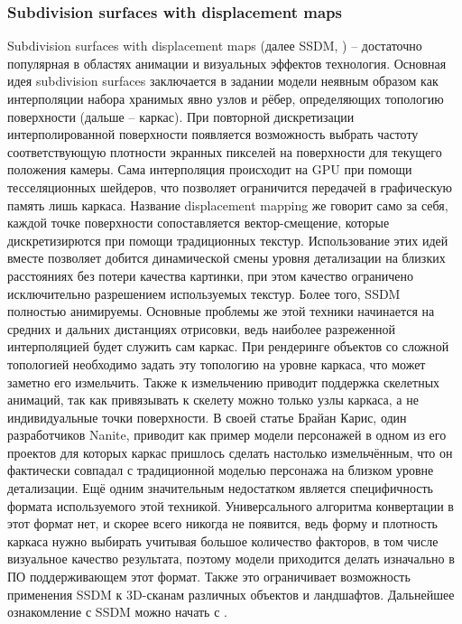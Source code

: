 \documentclass[12pt]{extarticle}
\begin{document}
\subsubsection{Subdivision surfaces with displacement maps}
Subdivision surfaces with displacement maps (далее SSDM, \cite{ssdm}) -- достаточно популярная в областях анимации и визуальных эффектов технология. Основная идея subdivision surfaces заключается в задании модели неявным образом как интерполяции набора хранимых явно узлов и рёбер, определяющих топологию поверхности (дальше -- каркас). При повторной дискретизации интерполированной поверхности появляется возможность выбрать частоту соответствующую плотности экранных пикселей на поверхности для текущего положения камеры. Сама интерполяция происходит на GPU при помощи тесселяционных шейдеров, что позволяет ограничится передачей в графическую память лишь каркаса. Название displacement mapping же говорит само за себя, каждой точке поверхности сопоставляется вектор-смещение, которые дискретизирются при помощи традиционных текстур. Использование этих идей вместе позволяет добится динамической смены уровня детализации на близких расстояниях без потери качества картинки, при этом качество ограничено исключительно разрешением используемых текстур. Более того, SSDM полностью анимируемы. Основные проблемы же этой техники начинается на средних и дальних дистанциях отрисовки, ведь наиболее разреженной интерполяцией будет служить сам каркас. При рендеринге объектов со сложной топологией необходимо задать эту топологию на уровне каркаса, что может заметно его измельчить. Также к измельчению приводит поддержка скелетных анимаций, так как привязывать к скелету можно только узлы каркаса, а не индивидуальные точки поверхности. В своей статье \cite{graphicrants_moregeometry} Брайан Карис, один разработчиков Nanite, приводит как пример модели персонажей в одном из его проектов для которых каркас пришлось сделать настолько измельчённым, что он фактически совпадал с традиционной моделью персонажа на близком уровне детализации. Ещё одним значительным недостатком является специфичность формата используемого этой техникой. Универсального алгоритма конвертации в этот формат нет, и скорее всего никогда не появится, ведь форму и плотность каркаса нужно выбирать учитывая большое количество факторов, в том числе визуальное качество результата, поэтому модели приходится делать изначально в ПО поддерживающем этот формат. Также это ограничивает возможность применения SSDM к 3D-сканам различных объектов и ландшафтов. Дальнейшее ознакомление с SSDM можно начать с \cite{ref}.
\end{document}
